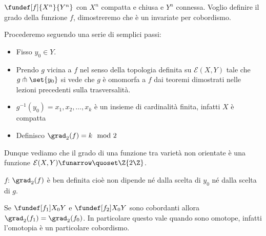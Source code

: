 $\fundef[f]{X^{n}}{Y^{n}}$ con $X^{n}$ compatta e chiusa e $Y^{n}$ connessa. Voglio definire il grado della funzione $f$, dimostreremo che è un invariate per cobordismo.

\begin{defn}
Procederemo seguendo una serie di semplici passi:
\begin{itemize}
 \item Fisso $y_{0} \in Y$.
 \item Prendo $g$ vicina a $f$ nel senso della topologia definita su $\mathcal{E}(X, Y)$ tale che $g \pitchfork \set{y_{0}}$ si vede che $g$ è 
 omomorfa a $f$ dai teoremi dimostrati nelle lezioni precedenti sulla trasversalità.
 \item $g^{-1}(y_{0}) = {x_{1}, x_{2}, \dots, x_{k}}$ è un insieme di cardinalità finita, infatti $X$ è compatta
 \item Definisco $\grad_{2}(f) = k \mod 2$
\end{itemize}
\end{defn}

Dunque vediamo che il grado di una funzione tra varietà non orientate è una funzione $ \mathcal{E}(X, Y) \funarrow \quoset\Z{2\Z}$.

\begin{teo}
$f$: $\grad_{2}(f)$ è ben definita cioè non dipende né dalla scelta di $y_{0}$ né dalla scelta di $g$. 
\end{teo}

\begin{teo}
 Se $\fundef[f_{1}]{X_{0}}{Y}$ e $\fundef[f_{2}]{X_{0}}{Y}$ sono cobordanti allora $\grad_{2}(f_{1}) = \grad_{2}(f_{0})$. In particolare questo vale quando sono omotope,
 infatti l'omotopia è un particolare cobordismo.
\end{teo}

